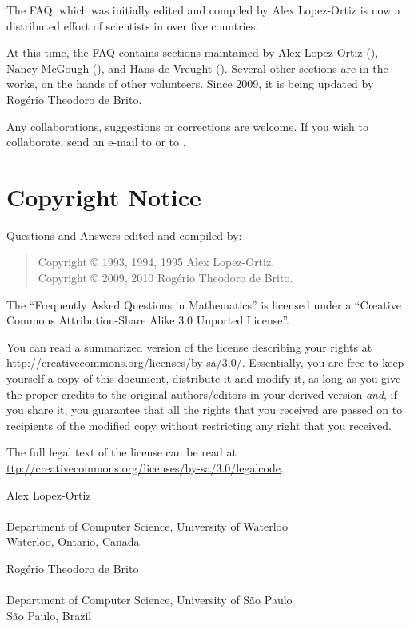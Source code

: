 The \scimath FAQ, which was initially edited and compiled by Alex
Lopez-Ortiz is now a distributed effort of scientists in over five
countries.

At this time, the FAQ contains sections maintained by Alex Lopez-Ortiz
(\emailalopez), Nancy McGough (\emailnancy), and Hans de Vreught
(\emailhans).  Several other sections are in the works, on the hands of
other volunteers. Since 2009, it is being updated by Rogério Theodoro de
Brito.

Any collaborations, suggestions or corrections are welcome. If you wish
to collaborate, send an e-mail to \emailrbrito or to \emailalopez.

\section{Copyright Notice}

Questions and Answers edited and compiled by:

\begin{verse}
  Copyright © 1993, 1994, 1995 Alex Lopez-Ortiz.\\
  Copyright © 2009, 2010 Rogério Theodoro de Brito.
\end{verse}

The \scimath ``Frequently Asked Questions in Mathematics'' is licensed
under a ``Creative Commons Attribution-Share Alike 3.0 Unported
License''.

You can read a summarized version of the license describing your rights
at \url{http://creativecommons.org/licenses/by-sa/3.0/}.  Essentially,
you are free to keep yourself a copy of this document, distribute it and
modify it, as long as you give the proper credits to the original
authors/editors in your derived version \emph{and}, if you share it, you
guarantee that all the rights that you received are passed on to
recipients of the modified copy without restricting any right that you
received.

The full legal text of the license can be read at
\url{ttp://creativecommons.org/licenses/by-sa/3.0/legalcode}.

\noindent
Alex Lopez-Ortiz\\
\emailalopez\\
Department of Computer Science, University of Waterloo\\
Waterloo, Ontario, Canada

\medskip

\noindent
Rogério Theodoro de Brito\\
\emailrbrito\\
Department of Computer Science, University of São Paulo\\
São Paulo, Brazil
